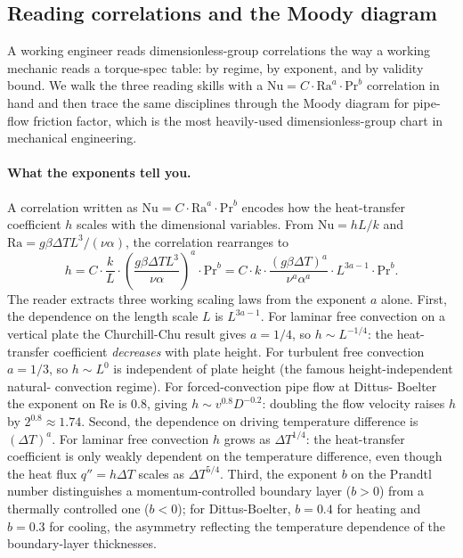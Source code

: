 \subsection{Reading correlations and the Moody diagram}

A working engineer reads dimensionless-group correlations the way a
working mechanic reads a torque-spec table: by regime, by exponent,
and by validity bound. We walk the three reading skills with a
$\mathrm{Nu} = C \cdot \mathrm{Ra}^{a} \cdot \mathrm{Pr}^{b}$
correlation in hand and then trace the same disciplines through the
Moody diagram for pipe-flow friction factor, which is the most
heavily-used dimensionless-group chart in mechanical engineering.

\paragraph{What the exponents tell you.} A correlation written as
$\mathrm{Nu} = C \cdot \mathrm{Ra}^{a} \cdot \mathrm{Pr}^{b}$
encodes how the heat-transfer coefficient $h$ scales with the
dimensional variables. From $\mathrm{Nu} = h L / k$ and
$\mathrm{Ra} = g \beta \Delta T L^{3} / (\nu \alpha)$, the
correlation rearranges to
\[
h = C \cdot \frac{k}{L} \cdot
   \left(\frac{g \beta \Delta T L^{3}}{\nu \alpha}\right)^{a}
   \cdot \mathrm{Pr}^{b}
= C \cdot k \cdot
  \frac{(g \beta \Delta T)^{a}}{\nu^{a} \alpha^{a}}
  \cdot L^{3a - 1} \cdot \mathrm{Pr}^{b}.
\]
The reader extracts three working scaling laws from the exponent
$a$ alone. First, the dependence on the length scale $L$ is
$L^{3a - 1}$. For laminar free convection on a vertical plate the
Churchill-Chu result gives $a = 1/4$, so $h \sim L^{-1/4}$: the
heat-transfer coefficient \emph{decreases} with plate height. For
turbulent free convection $a = 1/3$, so $h \sim L^{0}$ is
independent of plate height (the famous height-independent natural-
convection regime). For forced-convection pipe flow at Dittus-
Boelter the exponent on $\mathrm{Re}$ is $0.8$, giving $h \sim
v^{0.8} D^{-0.2}$: doubling the flow velocity raises $h$ by
$2^{0.8} \approx 1.74$. Second, the dependence on driving
temperature difference is $(\Delta T)^{a}$. For laminar free
convection $h$ grows as $\Delta T^{1/4}$: the heat-transfer
coefficient is only weakly dependent on the temperature difference,
even though the heat flux $q'' = h \Delta T$ scales as
$\Delta T^{5/4}$. Third, the exponent $b$ on the Prandtl number
distinguishes a momentum-controlled boundary layer
($b > 0$) from a thermally controlled one ($b < 0$); for
Dittus-Boelter, $b = 0.4$ for heating and $b = 0.3$ for cooling,
the asymmetry reflecting the temperature dependence of the
boundary-layer thicknesses.


